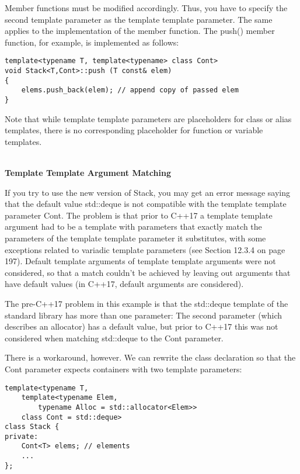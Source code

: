 Member functions must be modified accordingly. Thus, you have to specify the second template parameter as the template template parameter. The same applies to the implementation of the member function. The push() member function, for example, is implemented as follows:

\begin{lstlisting}[style=styleCXX]
template<typename T, template<typename> class Cont>
void Stack<T,Cont>::push (T const& elem)
{
	elems.push_back(elem); // append copy of passed elem
}
\end{lstlisting}

Note that while template template parameters are placeholders for class or alias templates, there is no corresponding placeholder for function or variable templates.

\hspace*{\fill} \\ %
\noindent
\textbf{Template Template Argument Matching}

If you try to use the new version of Stack, you may get an error message saying that the default value std::deque is not compatible with the template template parameter Cont. The problem is that prior to C++17 a template template argument had to be a template with parameters that exactly match the parameters of the template template parameter it substitutes, with some exceptions related to variadic template parameters (see Section 12.3.4 on page 197). Default template arguments of template template arguments were not considered, so that a match couldn’t be achieved by leaving out arguments that have default values (in C++17, default arguments are considered).

The pre-C++17 problem in this example is that the std::deque template of the standard library has more than one parameter: The second parameter (which describes an allocator) has a default value, but prior to C++17 this was not considered when matching std::deque to the Cont parameter.

There is a workaround, however. We can rewrite the class declaration so that the Cont parameter expects containers with two template parameters:

\begin{lstlisting}[style=styleCXX]
template<typename T,
	template<typename Elem,
		typename Alloc = std::allocator<Elem>>
	class Cont = std::deque>
class Stack {
private:
	Cont<T> elems; // elements
	...
};
\end{lstlisting}


